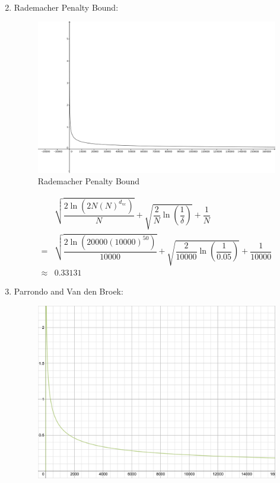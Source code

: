 \documentclass[12pt]{article}
\newcommand{\ParTh}[1]{\left(#1\right)}
\begin{document}
\begin{enumerate}
\begin{align}
\end{align}
\item Rademacher Penalty Bound:
\begin{figure}[h]
	\centering
	\includegraphics[scale=0.5]{RPB.png}
	\caption{Rademacher Penalty Bound}
	\label{4-3}
\end{figure}
\begin{align}
&\sqrt{\dfrac{2\ln\ParTh{{2N\ParTh{N}^{d_{\text{vc}}}}}}{N}}+\sqrt{\dfrac{2}{N}\ln\ParTh{\dfrac{1}{\delta}}}+\dfrac{1}{N}\\=&\sqrt{\dfrac{2\ln\ParTh{20000\ParTh{10000}^{50}}}{10000}}+\sqrt{\dfrac{2}{10000}\ln\ParTh{\dfrac{1}{0.05}}}+\dfrac{1}{10000}\\\approx&0.33131
\end{align}
\item Parrondo and Van den Broek:
\begin{figure}[h]
	\centering
	\includegraphics[scale=0.4]{PVB.png}

\end{figure}
\end{enumerate}
\end{document}
